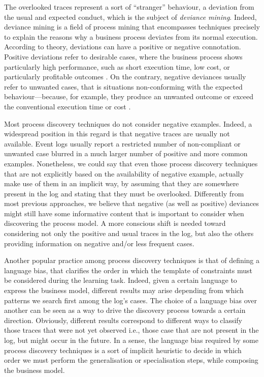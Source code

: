 The overlooked traces represent a sort of ``stranger'' behaviour, a deviation from the usual and expected conduct, which is the subject of \emph{deviance mining}\cite{2016-Nguyen}. 
%
Indeed, deviance mining is a field of process mining that encompasses techniques precisely to explain the reasons why a business process deviates from its normal execution. 
According to theory, deviations can have a positive or negative connotation. Positive deviations refer to desirable cases, where the business process shows particularly high performance, such as short execution time, low  cost, or particularly profitable outcomes \cite{2004-Spreitzer}. On the contrary, negative deviances usually refer to unwanted cases, that is situations non-conforming with the expected behaviour---because, for example, they produce an unwanted outcome or exceed the conventional execution time or cost \cite{2016-Nguyen}.
 
Most process discovery techniques do not consider negative examples. Indeed, a widespread position in this regard is that negative traces are usually not available. Event logs usually report a restricted number of non-compliant or unwanted case blurred in a much larger number of positive and more common examples. Nonetheless, we could say that even those process discovery techniques that are not explicitly based on the availability of negative example, actually make use of them in an implicit way, by assuming that they are somewhere present in the log and stating that they must be overlooked.
Differently from most previous approaches, we believe that negative (as well as positive) deviances might still have some informative content that is important to consider when discovering the process model. A more conscious shift is needed toward considering not only the positive and usual traces in the log, but also the others providing information on negative and/or less frequent cases.

Another popular practice among process discovery techniques is that of defining a language bias, that clarifies the order in which the template of constraints must be considered during the learning task. Indeed, given a certain language to express the business model, different results may arise depending from which patterns we search first among the log's cases. The choice of a language bias over another can be seen as a way to drive the discovery process towards a certain direction. Obviously, different results correspond to different ways to classify those traces that were not yet observed i.e., those case that are not present in the log, but might occur in the future.
In a sense, the language bias required by some process discovery techniques is a sort of implicit heuristic to decide in which order we must perform the generalisation or specialisation steps, while composing the business model.

